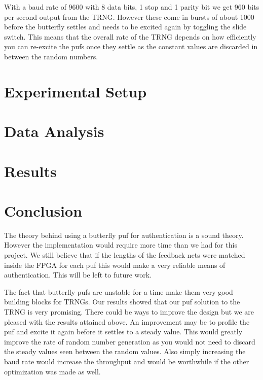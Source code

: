		With a baud rate of 9600 with 8 data bits, 1 stop and 1 parity bit we get 960 bits per second output from the TRNG.  However these come in bursts of about 1000 before the butterfly settles and needs to be excited again by toggling the slide switch.  This means that the overall rate of the TRNG depends on how efficiently you can re-excite the pufs once they settle as the constant values are discarded in between the random numbers.
		
\section{Experimental Setup} \label{sec::expr}
	
	

\section{Data Analysis}\label{sec::analysis} 

\section{Results}\label{res}

\section{Conclusion}\label{sec::conclusion} 
		The theory behind using a butterfly puf for authentication is a sound theory.  However the implementation would require more time than we had for this project.  We still believe that if the lengths of the feedback nets were matched inside the FPGA for each puf this would make a very reliable means of authentication.  This will be left to future work.
		
		The fact that butterfly pufs are unstable for a time make them very good building blocks for TRNGs.  Our results showed that our puf solution to the TRNG is very promising.  There could be ways to improve the design but we are pleased with the results attained above.  An improvement may be to profile the puf and excite it again before it settles to a steady value.  This would greatly improve the rate of random number generation as you would not need to discard the steady values seen between the random values.  Also simply increasing the baud rate would increase the throughput and would be worthwhile if the other optimization was made as well.














